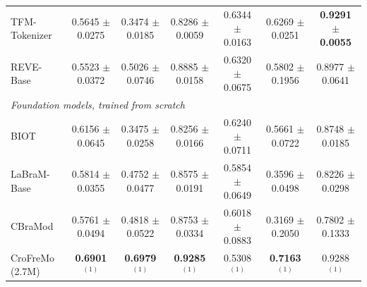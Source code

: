 \begin{table}[t]
{\begin{tabular}{lcccccc}
TFM-Tokenizer & 0.5645 $\pm$ 0.0275 & 0.3474 $\pm$ 0.0185 & 0.8286 $\pm$ 0.0059 & 0.6344 $\pm$ 0.0163 & 0.6269 $\pm$ 0.0251 & \textbf{0.9291 $\pm$ 0.0055} \\
REVE-Base & 0.5523 $\pm$ 0.0372 & 0.5026 $\pm$ 0.0746 & 0.8885 $\pm$ 0.0158 & 0.6320 $\pm$ 0.0675 & 0.5802 $\pm$ 0.1956 & 0.8977 $\pm$ 0.0641 \\
\midrule
\multicolumn{7}{l}{\textit{Foundation models, trained from scratch}} \\
BIOT & 0.6156 $\pm$ 0.0645 & 0.3475 $\pm$ 0.0258 & 0.8256 $\pm$ 0.0166 & 0.6240 $\pm$ 0.0711 & 0.5661 $\pm$ 0.0722 & 0.8748 $\pm$ 0.0185 \\
LaBraM-Base & 0.5814 $\pm$ 0.0355 & 0.4752 $\pm$ 0.0477 & 0.8575 $\pm$ 0.0191 & 0.5854 $\pm$ 0.0649 & 0.3596 $\pm$ 0.0498 & 0.8226 $\pm$ 0.0298 \\
CBraMod & 0.5761 $\pm$ 0.0494 & 0.4818 $\pm$ 0.0522 & 0.8753 $\pm$ 0.0334 & 0.6018 $\pm$ 0.0883 & 0.3169 $\pm$ 0.2050 & 0.7802 $\pm$ 0.1333 \\
\midrule
CroFreMo (2.7M) & \textbf{0.6901$^{(1)}$} & \textbf{0.6979$^{(1)}$} & \textbf{0.9285$^{(1)}$} & 0.5308$^{(1)}$ & \textbf{0.7163$^{(1)}$} & 0.9288$^{(1)}$ \\
\bottomrule
\end{tabular}}
\end{table}

